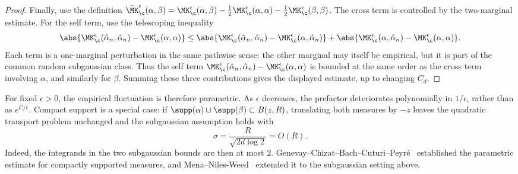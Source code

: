 \begin{proof}
	Finally, use the definition
	$\bar\MK_\c^\epsilon(\alpha,\beta) = \MK_\c^\epsilon(\alpha,\beta) -\frac12\MK_\c^\epsilon(\alpha,\alpha) -\frac12\MK_\c^\epsilon(\beta,\beta)$.
	The cross term is controlled by the two-marginal estimate. For the self term, use the telescoping inequality
	\[
		\abs{\MK_\c^\epsilon(\hat\alpha_n,\hat\alpha_n)-\MK_\c^\epsilon(\alpha,\alpha)}
		\leq
		\abs{\MK_\c^\epsilon(\hat\alpha_n,\hat\alpha_n)-\MK_\c^\epsilon(\alpha,\hat\alpha_n)}
		+
		\abs{\MK_\c^\epsilon(\alpha,\hat\alpha_n)-\MK_\c^\epsilon(\alpha,\alpha)}.
	\]
	Each term is a one-marginal perturbation in the same pathwise sense: the other marginal may itself be empirical, but it is part of the common random subgaussian class. Thus the self term
	\(\MK_\c^\epsilon(\hat\alpha_n,\hat\alpha_n)-\MK_\c^\epsilon(\alpha,\alpha)\)
	is bounded at the same order as the cross term involving \(\alpha\), and similarly for \(\beta\). Summing these three contributions gives the displayed estimate, up to changing \(C_d\).
\end{proof}

For fixed \(\epsilon>0\), the empirical fluctuation is therefore parametric. As \(\epsilon\) decreases, the prefactor deteriorates polynomially in \(1/\epsilon\), rather than as \(e^{C/\epsilon}\). Compact support is a special case: if \(\supp(\alpha)\cup\supp(\beta)\subset B(z,R)\), translating both measures by \(-z\) leaves the quadratic transport problem unchanged and the subgaussian assumption holds with
\[
	\sigma=\frac{R}{\sqrt{2d\log 2}}=O(R).
\]
Indeed, the integrands in the two subgaussian bounds are then at most \(2\). Genevay--Chizat--Bach--Cuturi--Peyr\'e~\cite{genevay2018sample} established the parametric estimate for compactly supported measures, and Mena--Niles-Weed~\cite{mena2019statistical} extended it to the subgaussian setting above.

